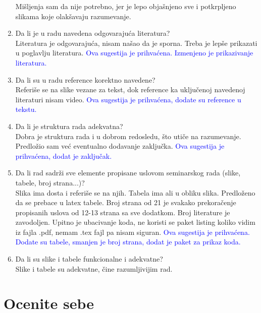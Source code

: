 \documentclass[a4paper]{report}
\newcommand{\odgovor}[1]{\textcolor{blue}{#1}}
\begin{document}
\begin{enumerate}
Mišljenja sam da nije potrebno, jer je lepo objašnjeno sve i potkrpljeno slikama koje olakšavaju razumevanje.

\item Da li je u radu navedena odgovarajuća literatura?\\

Literatura je odgovarajuća, nisam našao da je sporna. Treba je lepše prikazati u poglavlju literatura.
\odgovor{Ova sugestija je prihvaćena. Izmenjeno je prikazivanje literatura.}

\item Da li su u radu reference korektno navedene?\\

Referiše se na slike vezane za tekst, dok reference ka uključenoj navedenoj literaturi nisam video.
\odgovor{Ova sugestija je prihvaćena, dodate su reference u tekstu.}

\item Da li je struktura rada adekvatna?\\

Dobra je struktura rada i u dobrom redosledu, što utiče na razumevanje. Predložio sam već eventualno dodavanje zaključka.
\odgovor{Ova sugestija je prihvaćena, dodat je zaključak.}
\item Da li rad sadrži sve elemente propisane uslovom seminarskog rada (slike, tabele, broj strana...)?\\

Slika ima dosta i referiše se na njih.
Tabela ima ali u obliku slika. Predloženo da se prebace u latex tabele.
Broj strana od 21 je svakako prekoračenje propisanih uslova od 12-13 strana sa sve dodatkom.
Broj literature je zavodoljen.
Upitno je ubacivanje koda, ne koristi se paket listing koliko vidim iz fajla .pdf, nemam .tex fajl pa nisam siguran.
\odgovor{Ova sugestija je prihvaćena. Dodate su tabele, smanjen je broj strana, dodat je paket za prikaz koda.}

\item Da li su slike i tabele funkcionalne i adekvatne?\\

Slike i tabele su adekvatne, čine razumljivijim rad.

\end{enumerate}

\section{Ocenite sebe}
\end{document}

